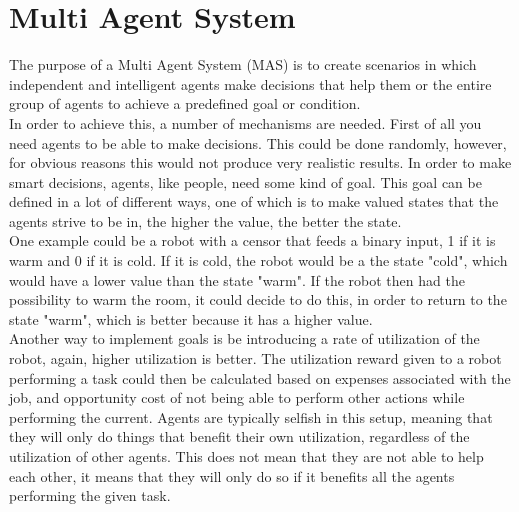 \chapter{Multi Agent System}
The purpose of a Multi Agent System (MAS) is to create scenarios in which independent and intelligent agents make decisions that help them or the entire group of agents to achieve a predefined goal or condition.\\
\indent In order to achieve this, a number of mechanisms are needed. First of all you need agents to be able to make decisions. This could be done randomly, however, for obvious reasons this would not produce very realistic results. In order to make smart decisions, agents, like people, need some kind of goal. This goal can be defined in a lot of different ways, one of which is to make valued states that the agents strive to be in, the higher the value, the better the state.\\
\indent One example could be a robot with a censor that feeds a binary input, 1 if it is warm and 0 if it is cold. If it is cold, the robot would be a the state "cold", which would have a lower value than the state "warm". If the robot then had the possibility to warm the room, it could decide to do this, in order to return to the state "warm", which is better because it has a higher value.\\
\indent Another way to implement goals is be introducing a rate of utilization of the robot, again, higher utilization is better. The utilization reward given to a robot performing a task could then be calculated based on expenses associated with the job, and opportunity cost of not being able to perform other actions while performing the current. Agents are typically selfish in this setup, meaning that they will only do things that benefit their own utilization, regardless of the utilization of other agents. This does not mean that they are not able to help each other, it means that they will only do so if it benefits all the agents performing the given task.